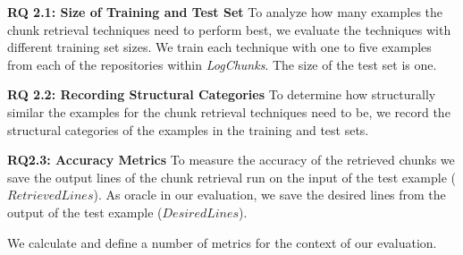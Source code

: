 \noindent %
\textbf{RQ 2.1: Size of Training and Test Set}
To analyze how many examples the chunk retrieval techniques need to
perform best, we evaluate the techniques with different training set
sizes. We train each technique with one to five examples from each of
the repositories within \emph{LogChunks}. The size of the test set is
one.

\noindent
\textbf{RQ 2.2: Recording Structural Categories}
To determine how structurally similar the examples for the chunk
retrieval techniques need to be, we record the structural categories
of the examples in the training and test sets.

\noindent
\textbf{RQ2.3: Accuracy Metrics}
To measure the accuracy of the retrieved chunks we save the output
lines of the chunk retrieval run on the input of the test example
($\mathit{RetrievedLines}$). As oracle in our evaluation, we save the
desired lines from the output of the test example
($\mathit{DesiredLines}$).

We calculate and define a number of metrics for the context of our
evaluation.

